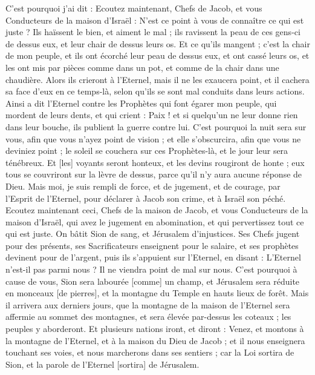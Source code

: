\begin{multicols}{2}
\VerseOne{}C'est pourquoi j'ai dit : Ecoutez maintenant, Chefs de Jacob, et vous Conducteurs de la maison d'Israël : N'est ce point à vous de connaître ce qui est juste ?
Ils haïssent le bien, et aiment le mal ; ils ravissent la peau de ces gens-ci de dessus eux, et leur chair de dessus leurs os.
Et ce qu'ils mangent ; c'est la chair de mon peuple, et ils ont écorché leur peau de dessus eux, et ont cassé leurs os, et les ont mis par pièces comme dans un pot, et comme de la chair dans une chaudière.
Alors ils crieront à l'Eternel, mais il ne les exaucera point, et il cachera sa face d'eux en ce temps-là, selon qu'ils se sont mal conduits dans leurs actions.
Ainsi a dit l'Eternel contre les Prophètes qui font égarer mon peuple, qui mordent de leurs dents, et qui crient : Paix ! et si quelqu'un ne leur donne rien dans leur bouche, ils publient la guerre contre lui.
C'est pourquoi la nuit sera sur vous, afin que vous n'ayez point de vision ; et elle s'obscurcira, afin que vous ne deviniez point ; le soleil se couchera sur ces Prophètes-là, et le jour leur sera ténébreux.
Et [les] voyants seront honteux, et les devins rougiront de honte ; eux tous se couvriront sur la lèvre de dessus, parce qu'il n'y aura aucune réponse de Dieu.
Mais moi, je suis rempli de force, et de jugement, et de courage, par l'Esprit de l'Eternel, pour déclarer à Jacob son crime, et à Israël son péché.
Ecoutez maintenant ceci, Chefs de la maison de Jacob, et vous Conducteurs de la maison d'Israël, qui avez le jugement en abomination, et qui pervertissez tout ce qui est juste.
On bâtit Sion de sang, et Jérusalem d'injustices.
Ses Chefs jugent pour des présents, ses Sacrificateurs enseignent pour le salaire, et ses prophètes devinent pour de l'argent, puis ils s'appuient sur l'Eternel, en disant : L'Eternel n'est-il pas parmi nous ? Il ne viendra point de mal sur nous.
C'est pourquoi à cause de vous, Sion sera labourée [comme] un champ, et Jérusalem sera réduite en monceaux [de pierres], et la montagne du Temple en hauts lieux de forêt.
\VerseOne{}Mais il arrivera aux derniers jours, que la montagne de la maison de l'Eternel sera affermie au sommet des montagnes, et sera élevée par-dessus les coteaux ; les peuples y aborderont.
Et plusieurs nations iront, et diront : Venez, et montons à la montagne de l'Eternel, et à la maison du Dieu de Jacob ; et il nous enseignera touchant ses voies, et nous marcherons dans ses sentiers ; car la Loi sortira de Sion, et la parole de l'Eternel [sortira] de Jérusalem.

\end{multicols}
